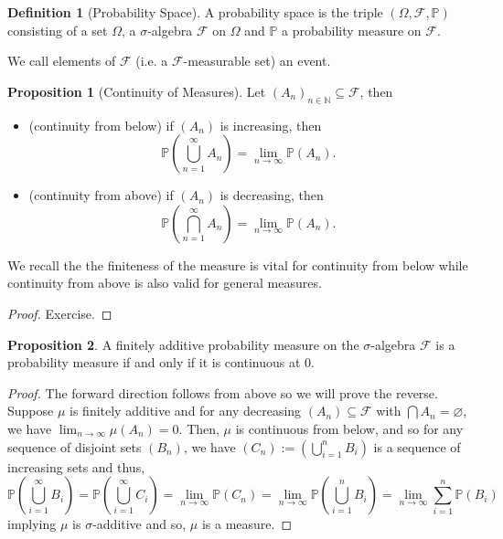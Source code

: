 \documentclass[]{article}
\theoremstyle{definition}
\theoremstyle{definition}
\newtheorem{definition}{Definition}[section]
\newtheorem{proposition}{Proposition}[section]
\begin{document}
\begin{definition}[Probability Space]
  A probability space is the triple \((\Omega, \mathcal{F}, \mathbb{P})\) consisting 
  of a set \(\Omega\), a \(\sigma\)-algebra \(\mathcal{F}\) on \(\Omega\) and 
  \(\mathbb{P}\) a probability measure on \(\mathcal{F}\).

  We call elements of \(\mathcal{F}\) (i.e. a \(\mathcal{F}\)-measurable set) an event.
\end{definition}

\begin{proposition}[Continuity of Measures]
  Let \((A_n)_{n \in \mathbb{N}} \subseteq \mathcal{F}\), then 
  \begin{itemize}
    \item (continuity from below) if \((A_n)\) is increasing, then 
      \[\mathbb{P}\left(\bigcup_{n = 1}^\infty A_n\right) = \lim_{n \to \infty} \mathbb{P}(A_n).\]
    \item (continuity from above) if \((A_n)\) is decreasing, then 
      \[\mathbb{P}\left(\bigcap_{n = 1}^\infty A_n\right) = \lim_{n \to \infty} \mathbb{P}(A_n).\]
  \end{itemize}
  We recall the the finiteness of the measure is vital for continuity from below 
  while continuity from above is also valid for general measures.
\end{proposition}
\begin{proof}
  Exercise.
\end{proof}

\begin{proposition}
  A finitely additive probability measure on the \(\sigma\)-algebra \(\mathcal{F}\) 
  is a probability measure if and only if it is continuous at 0.
\end{proposition}
\begin{proof}
  The forward direction follows from above so we will prove the reverse. 
  Suppose \(\mu\) is finitely additive and for any decreasing \((A_n) \subseteq \mathcal{F}\)
  with \(\bigcap A_n = \varnothing\), we have \(\lim_{n \to \infty} \mu(A_n) = 0\).
  Then, \(\mu\) is continuous from below, and so for any sequence of disjoint 
  sets \((B_n)\), we have \((C_n) := (\bigcup_{i = 1}^n B_i)\) is a sequence of increasing 
  sets and thus, 
  \[\mathbb{P}\left(\bigcup_{i = 1}^\infty B_i \right) 
    = \mathbb{P}\left(\bigcup_{i = 1}^\infty C_i \right) 
    = \lim_{n \to \infty} \mathbb{P}(C_n)
    = \lim_{n \to \infty} \mathbb{P}\left(\bigcup_{i = 1}^n B_i \right)
    = \lim_{n \to \infty} \sum_{i = 1}^n \mathbb{P}(B_i)\]
  implying \(\mu\) is \(\sigma\)-additive and so, \(\mu\) is a measure.
\end{proof}
\end{document}
